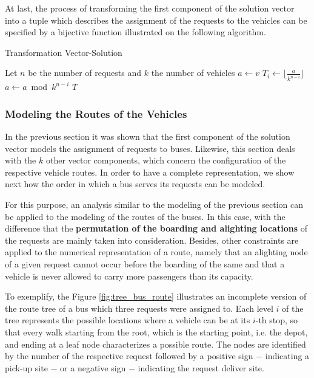 \documentclass[tuberlin,cic,tc,openright,english,noabntcite,oneside]{iiufrgs}
\begin{document}
At last, the process of transforming the first component of the solution vector into a tuple which describes the assignment of the requests to the vehicles can be specified by a bijective function illustrated on the following algorithm.
\begin{algorithm}[H]
\caption{Transformation Vector-Solution}
\begin{algorithmic}
\State Let $n$ be the number of requests and $k$ the number of vehicles
\State $a \gets v$
	\State $\displaystyle T_{i} \gets \lfloor \frac{a}{k^{n-i}} \rfloor$
	\State $a \gets a \bmod k^{n-i}$
\EndFor
\State \Return $T$
\EndFunction
\end{algorithmic}
\end{algorithm}

\subsubsection{Modeling the Routes of the Vehicles}\label{sec:model-routes}
In the previous section it was shown that the first component of the solution vector models the assignment of requests to buses. Likewise, this section deals with the $k$ other vector components, which concern the configuration of the respective vehicle routes. In order to have a complete representation, we show next how the order in which a bus serves its requests can be modeled.

For this purpose, an analysis similar to the modeling of the previous section can be applied to the modeling of the routes of the buses. In this case, with the difference that the \textbf{permutation of the boarding and alighting locations} of the requests are mainly taken into consideration. Besides, other constraints are applied to the numerical representation of a route, namely that an alighting node of a given request cannot occur before the boarding of the same and that a vehicle is never allowed to carry more passengers than its capacity.

To exemplify, the Figure \ref{fig:tree_bus_route} illustrates an incomplete version of the route tree of a bus which three requests were assigned to. Each level $i$ of the tree represents the possible locations where a vehicle can be at its $i$-th stop, so that every walk starting from the root, which is the starting point, i.e. the depot, and ending at a leaf node characterizes a possible route. The nodes are identified by the number of the respective request followed by a positive sign $-$ indicating a pick-up site $-$ or a negative sign $-$ indicating the request deliver site.
\end{document}
